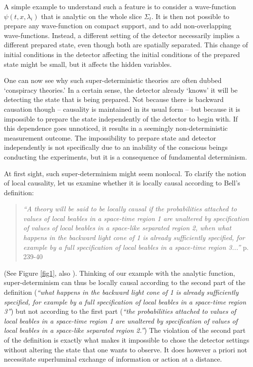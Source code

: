 \documentclass{svjour2}                    %
\begin{document}
A simple example 
to understand such a feature is to 
consider a wave-function $\psi(t, x, \lambda_i)$ that is analytic on the whole slice $\Sigma_t$. It is
then not possible to prepare any wave-function on compact support, and to add non-overlapping
wave-functions. Instead, a different
setting of the detector necessarily implies a different prepared state, even though
both are spatially separated.
This change of initial conditions in the detector affecting the initial
conditions of the prepared state might be small, but it affects 
the hidden variables. 

One can now see why such super-deterministic theories are often dubbed `conspiracy theories.' 
In a certain sense, the detector already `knows' it will be detecting the
state that is being prepared. Not because there is backward causation
though -- causality is maintained in
its usual form -- but because it is impossible to prepare the state independently
of the detector to begin with. 
If this dependence goes unnoticed, it results in a seemingly non-deterministic 
measurement outcome. The impossibility to prepare state and detector independently
is not specifically due to an inability of the conscious beings conducting the 
experiments, but it is a consequence of fundamental determinism. 

At first sight, such super-determinism might seem nonlocal. 
To clarify the notion of local causality, let us examine whether it is locally causal according 
to Bell's definition:
\begin{quote}
 {\it ``A theory will be said to be locally causal if the probabilities attached to values of local beables in a space-time region 1 are unaltered by specification of values of local beables in a space-like separated region 2, when what happens in the backward light cone of 1 is already sufficiently specified, for example by a full specification of local beables in a space-time region 3...''} \cite{Bell} p. 239-40
\end{quote}

(See Figure \ref{fig1}, also \cite{lc}). Thinking of our example with the analytic function, super-determinism can thus be locally causal 
according to the second part of the definition ({\it ``what happens in the backward light cone of 1 is already sufficiently specified, for example by a full specification of local beables in a space-time region 3''}) but not according to the first part ({\it ``the probabilities attached to values of local beables in a space-time region 1 are unaltered by specification of values of local beables in a space-like separated region 2.''}) The violation of
the second part of the definition is exactly what makes it impossible to chose the detector settings without altering the state that one wants to observe. It does however a priori not 
necessitate superluminal exchange of information or action at a distance.
\end{document}
